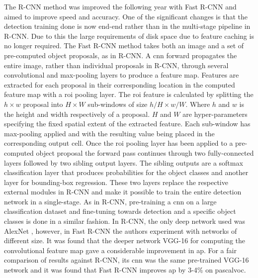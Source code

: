 The R-CNN method was improved the following year with Fast R-CNN \cite{fastrcnn} and aimed to improve speed and accuracy. One of the significant changes is that the detection training done is now end-end rather than in the multi-stage pipeline in R-CNN. Due to this the large requirements of disk space due to feature caching is no longer required. The Fast R-CNN method takes both an image and a set of pre-computed object proposals, as in R-CNN. A \gls{cnn} forward propagates the entire image, rather than individual proposals in R-CNN, through several convolutional and max-pooling layers to produce a feature map. Features are extracted for each proposal in their corresponding location in the computed feature map with a \gls{roi} pooling layer. The \gls{roi} feature is calculated by splitting the $h \times w$ proposal into $H \times W$ sub-windows of size $h/H \times w/W$. Where $h$ and $w$ is the height and width respectively of a proposal. $H$ and $W$ are hyper-parameters specifying the fixed spatial extent of the extracted feature. Each sub-window has max-pooling applied and with the resulting value being placed in the corresponding output cell. Once the \gls{roi} pooling layer has been applied to a pre-computed object proposal the forward pass continues through two fully-connected layers followed by two sibling output layers. The sibling outputs are a softmax classification layer that produces probabilities for the object classes and another layer for bounding-box regression. These two layers replace the respective external modules in R-CNN and make it possible to train the entire detection network in a single-stage. As in R-CNN, pre-training a \gls{cnn} on a large classification dataset and fine-tuning towards detection and a specific object classes is done in a similar fashion. In R-CNN, the only deep network used was AlexNet \cite{alexnet}, however, in Fast R-CNN the authors experiment with networks of different size. It was found that the deeper network VGG-16 \cite{vgg16} for computing the convolutional feature map gave a considerable improvement in \gls{ap}. For a fair comparison of results against R-CNN, its \gls{cnn} was the same pre-trained VGG-16 network and it was found that Fast R-CNN improves \gls{ap} by 3-4\% on \gls{pascalvoc}.
\begin{comment}
	\begin{table}[]
	\centering
	\caption{A comparison of R-CNN and Fast R-CNN \gls{pascalvoc} \gls{ap} results on the test set from 2007, 2010, and 2012.}
	\label{tab:fastresults}
	\begin{tabular}{|l|l|l|l|}
	 \hline
	           & 2007 & 2010 & 2012 \\ \hline
	R-CNN      & 66.0 & 62.9 & 62.4 \\ 
	Fast R-CNN & \textbf{66.9} & \textbf{66.1} & \textbf{65.7} \\ \hline
	\end{tabular}
	\end{table}
\end{comment}

